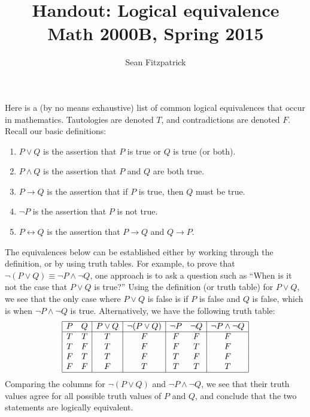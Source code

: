 \documentclass[letterpaper,12pt]{article}
\title{Handout: Logical equivalence\\Math 2000B, Spring 2015}
\author{Sean Fitzpatrick}
\begin{document}
\maketitle
Here is a (by no means exhaustive) list of common logical equivalences that occur in mathematics.  Tautologies are denoted $T$, and contradictions are denoted $F$. Recall our basic definitions:
\begin{enumerate}
 \item $P\vee Q$ is the assertion that $P$ is true or $Q$ is true (or both).
 \item $P\wedge Q$ is the assertion that $P$ and $Q$ are both true.
 \item $P\to Q$ is the assertion that if $P$ is true, then $Q$ must be true.
 \item $\neg P$ is the assertion that $P$ is not true.
 \item $P\leftrightarrow Q$ is the assertion that $P\to Q$ and $Q\to P$.
\end{enumerate}
The equivalences below can be established either by working through the definition, or by using truth tables. For example, to prove that $\neg(P\vee Q)\equiv \neg P\wedge\neg Q$, one approach is to ask a question such as ``When is it not the case that $P\vee Q$ is true?'' Using the definition (or truth table) for $P\vee Q$, we see that the only case where $P\vee Q$ is false is if $P$ is false and $Q$ is false, which is when $\neg P\wedge \neg Q$ is true. Alternatively, we have the following truth table:
\[
 \begin{array}{|cc|c|c|cc|c|}
\hline
 P & Q & P\vee Q & \neg  (P\vee Q) & \neg P & \neg Q & \neg P\wedge \neg Q\\
\hline
 T & T & T & F & F & F & F\\
 T & F & T & F & F & T & F\\
 F & T & T & F & T & F & F\\
 F & F & F & T & T & T & T\\
\hline
 \end{array}
\]
Comparing the columns for $\neg(P\vee Q)$ and $\neg P\wedge \neg Q$, we see that their truth values agree for all possible truth values of $P$ and $Q$, and conclude that the two statements are logically equivalent.
\newpage
\end{document}
